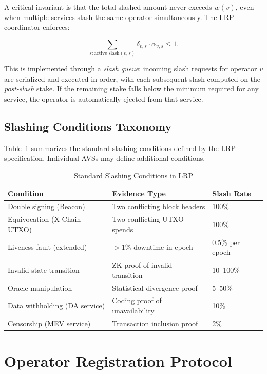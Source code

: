 \documentclass[11pt]{article}
\begin{document}
A critical invariant is that the total slashed amount never exceeds $w(v)$, even when
multiple services slash the same operator simultaneously. The LRP coordinator enforces:

\[
  \sum_{s: \text{active slash}(v,s)} \delta_{v,s} \cdot \alpha_{v,s} \leq 1.
\]

This is implemented through a \emph{slash queue}: incoming slash requests for operator $v$
are serialized and executed in order, with each subsequent slash computed on the
\emph{post-slash} stake. If the remaining stake falls below the minimum required for any
service, the operator is automatically ejected from that service.

\subsection{Slashing Conditions Taxonomy}

Table~\ref{tab:slash_conditions} summarizes the standard slashing conditions defined by
the LRP specification. Individual AVSs may define additional conditions.

\begin{table}[H]
\centering
\caption{Standard Slashing Conditions in LRP}
\label{tab:slash_conditions}
\begin{tabular}{lll}
\toprule
\textbf{Condition} & \textbf{Evidence Type} & \textbf{Slash Rate} \\
\midrule
Double signing (Beacon) & Two conflicting block headers & 100\% \\
Equivocation (X-Chain UTXO) & Two conflicting UTXO spends & 100\% \\
Liveness fault (extended) & $> 1\%$ downtime in epoch & 0.5\% per epoch \\
Invalid state transition & ZK proof of invalid transition & 10--100\% \\
Oracle manipulation & Statistical divergence proof & 5--50\% \\
Data withholding (DA service) & Coding proof of unavailability & 10\% \\
Censorship (MEV service) & Transaction inclusion proof & 2\% \\
\bottomrule
\end{tabular}
\end{table}

\section{Operator Registration Protocol}
\label{sec:operators}
\end{document}
